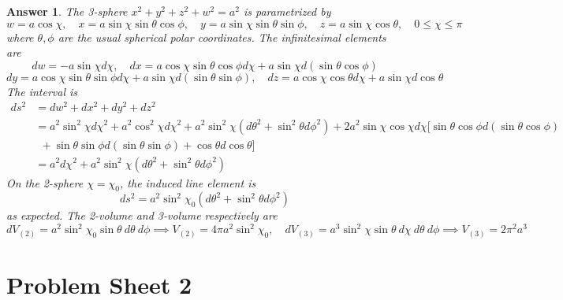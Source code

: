 \documentclass[a4paper]{article}
\theoremstyle{new2}
\newtheorem{ans}{Answer}[section]
\theoremstyle{new}
\begin{document}
\begin{ans}
The 3-sphere $x^2+y^2+z^2+w^2=a^2$ is parametrized by
$$w=a\cos\chi,\quad x=a\sin\chi\sin\theta\cos\phi,\quad y=a\sin\chi\sin\theta\sin\phi,\quad z=a\sin\chi\cos\theta,\quad 0\leq\chi\leq\pi$$
where $\theta,\phi$ are the usual spherical polar coordinates. The infinitesimal elements are
$$dw=-a\sin\chi d\chi,\quad dx=a\cos\chi\sin\theta\cos\phi d\chi+a\sin\chi d(\sin\theta\cos\phi)$$
$$dy=a\cos\chi\sin\theta\sin\phi d\chi+a\sin\chi d(\sin\theta\sin\phi),\quad dz=a\cos\chi\cos\theta d\chi+a\sin\chi d\cos\theta$$
The interval is
\begin{align}
    ds^2&=dw^2+dx^2+dy^2+dz^2\nonumber\\&=a^2\sin^2\chi d\chi^2+a^2\cos^2\chi d\chi^2+a^2\sin^2\chi(d\theta^2+\sin^2\theta d\phi^2)+2a^2\sin\chi\cos\chi d\chi[\sin\theta\cos\phi d(\sin\theta\cos\phi)\nonumber\\&~~+\sin\theta\sin\phi d(\sin\theta\sin\phi)+\cos\theta d\cos\theta]\nonumber\\&=a^2d\chi^2+a^2\sin^2\chi(d\theta^2+\sin^2\theta d\phi^2)\nonumber
\end{align}
On the 2-sphere $\chi=\chi_0$, the induced line element is
$$ds^2=a^2\sin^2\chi_0(d\theta^2+\sin^2\theta d\phi^2)$$
as expected. The 2-volume and 3-volume respectively are
$$dV_{(2)}=a^2\sin^2\chi_0\sin\theta~d\theta~d\phi\implies V_{(2)}=4\pi a^2\sin^2\chi_0,\quad dV_{(3)}=a^3\sin^2\chi\sin\theta~d\chi~d\theta~d\phi\implies V_{(3)}=2\pi^2a^3$$
\end{ans}


\newpage
\section{Problem Sheet 2}
\end{document}
